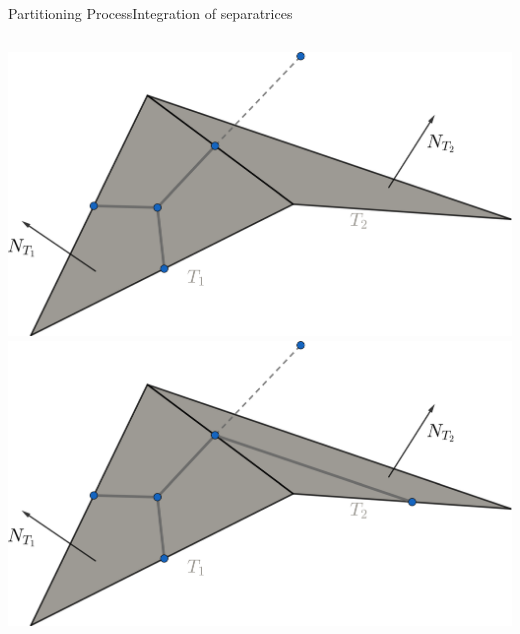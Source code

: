 \documentclass[compress,10pt,aspectratio=169]{beamer}
\begin{document}
\begin{frame}{Partitioning Process}{Integration of separatrices}
\begin{columns}
\begin{column}{0.5\textwidth}
\centering
\vspace{-0.1cm}
\includegraphics[scale=0.15]{images/draw_sepa_space_1.pdf}\\\vspace{0.2cm}
\includegraphics[scale=0.15]{images/draw_sepa_space_2.pdf}\\\vspace{0.3cm}
\end{column}
\end{columns}
\end{frame}
\end{document}
